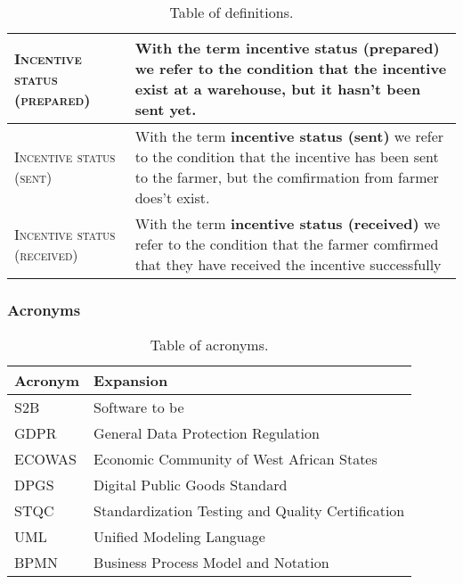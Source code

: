 \begin{table}[H]
\begin{tabular}{|m{}|m{}|}
        \hline
        \textsc{Incentive status (prepared)}     &   With the term \textbf{incentive status (prepared)} we refer to the condition that the incentive exist at a warehouse, but it hasn't been sent yet. \\
        \hline
        \textsc{Incentive status (sent)}     &   With the term \textbf{incentive status (sent)} we refer to the condition that the incentive has been sent to the farmer, but the comfirmation from farmer does't exist. \\
        \hline
        \textsc{Incentive status (received)}     &   With the term \textbf{incentive status (received)} we refer to the condition that the farmer comfirmed that they have received the incentive successfully \\
        \hline
    \end{tabular}
    
    \caption{\label{tab:def_table}Table of definitions.}
    
\end{table}

\subsubsection{Acronyms}
\begin{table}[H]
    \setlength\arrayrulewidth{1pt}
    \centering
    \begin{tabular}{|l|l|}
        \rowcolor{myblue}
        \hline
        \color{white}Acronym & \color{white}Expansion \\
        \hline
        \textsc{S2B}     &   Software to be \\
        \hline
        \textsc{GDPR}  &    General Data Protection Regulation\\
        \hline
        \textsc{ECOWAS}  &    Economic Community of West African States\\
        \hline
        \textsc{DPGS}  &    Digital Public Goods Standard\\
        \hline
        \textsc{STQC}  &    Standardization Testing and Quality Certification\\
        \hline
        \textsc{UML}  &    Unified Modeling Language\\
        \hline
        \textsc{BPMN}  &    Business Process Model and Notation\\
        \hline
    \end{tabular}
    
    \caption{\label{tab:acronyms_table}Table of acronyms.}
    
\end{table}

